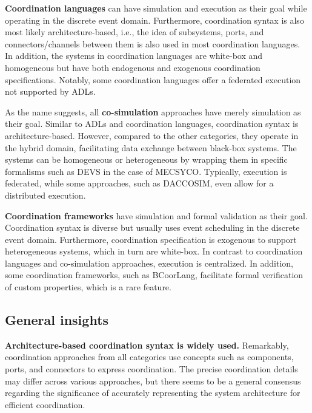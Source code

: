\documentclass[runningheads]{llncs}
\begin{document}
\textbf{Coordination languages} can have simulation and execution as their goal while operating in the discrete event domain.
Furthermore, coordination syntax is also most likely architecture-based, i.e., the idea of subsystems, ports, and connectors/channels between them is also used in most coordination languages.
In addition, the systems in coordination languages are white-box and homogeneous but have both endogenous and exogenous coordination specifications.
Notably, some coordination languages offer a federated execution not supported by ADLs.

As the name suggests, all \textbf{co-simulation} approaches have merely simulation as their goal.
Similar to ADLs and coordination languages, coordination syntax is architecture-based.
However, compared to the other categories, they operate in the hybrid domain, facilitating data exchange between black-box systems.
The systems can be homogeneous or heterogeneous by wrapping them in specific formalisms such as DEVS in the case of MECSYCO.
Typically, execution is federated, while some approaches, such as DACCOSIM, even allow for a distributed execution.

\textbf{Coordination frameworks} have simulation and formal validation as their goal.
Coordination syntax is diverse but usually uses event scheduling in the discrete event domain.
Furthermore, coordination specification is exogenous to support heterogeneous systems, which in turn are white-box.
In contrast to coordination languages and co-simulation approaches, execution is centralized.
In addition, some coordination frameworks, such as BCoorLang, facilitate formal verification of custom properties, which is a rare feature.

\subsection{General insights}

\textbf{Architecture-based coordination syntax is widely used.}
Remarkably, coordination approaches from all categories use concepts such as components, ports, and connectors to express coordination.
The precise coordination details may differ across various approaches, but there seems to be a general consensus regarding the significance of accurately representing the system architecture for efficient coordination.
\end{document}
